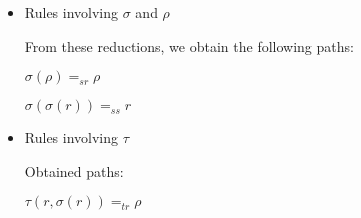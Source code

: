 \documentclass{entcs} \usepackage{entcsmacro}
\begin{document}
\begin{itemize}
\item Rules involving $\sigma$ and $\rho$

\bigskip

\begin{prooftree}
\end{prooftree}

\begin{prooftree}
\end{prooftree}

\bigskip

From these reductions, we obtain the following paths:

$\sigma(\rho) =_{sr} \rho$

$\sigma(\sigma(r)) =_{ss} r$
\bigskip

\item Rules involving $\tau$

\bigskip
\begin{prooftree}
\end{prooftree}

\begin{prooftree}
\end{prooftree}

\begin{prooftree}
\end{prooftree}

\begin{prooftree}
\end{prooftree}

\bigskip

Obtained paths:

$\tau(r,\sigma(r)) =_{tr} \rho$


\end{itemize}
\end{document}

